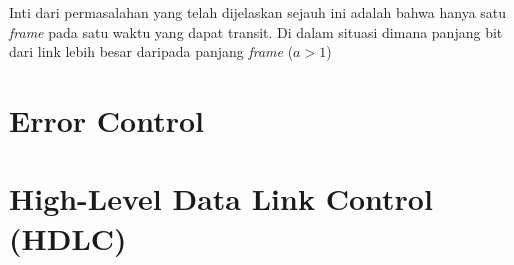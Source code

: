 Inti dari permasalahan yang telah dijelaskan sejauh ini adalah bahwa hanya satu \textit{frame} pada satu waktu yang dapat transit. Di dalam situasi dimana panjang bit dari link lebih besar daripada panjang \textit{frame} ($ a > 1 $)

\section{Error Control}


\section{High-Level Data Link Control (HDLC)}
